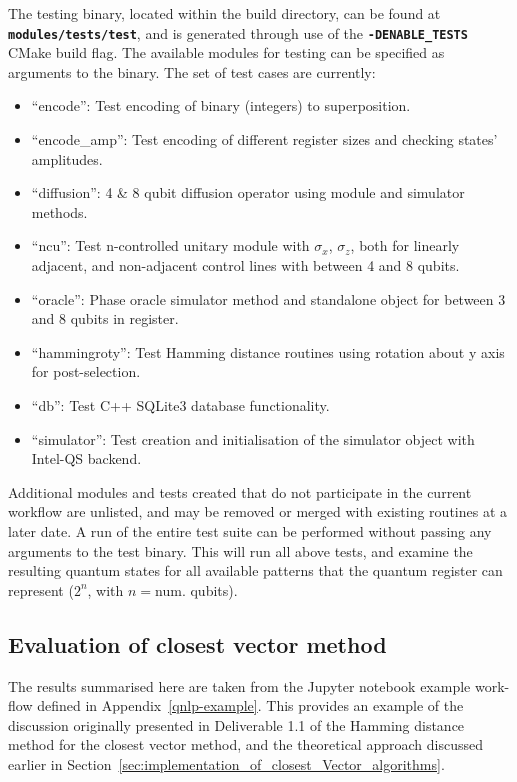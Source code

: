The testing binary, located within the build directory, can be found at \textbf{\lstinline{modules/tests/test}}, and is generated through use of the \textbf{\lstinline{-DENABLE_TESTS}} CMake build flag. The available modules for testing can be specified as arguments to the binary. The set of test cases are currently:
\begin{itemize}
    \item ``encode'': Test encoding of binary (integers) to superposition.
    \item ``encode\_amp'': Test encoding of different register sizes and checking states' amplitudes.
    \item ``diffusion'': 4 \& 8 qubit diffusion operator using module and simulator methods.
    \item ``ncu'': Test n-controlled unitary module with $\sigma_x$, $\sigma_z$, both for linearly adjacent, and non-adjacent control lines with between 4 and 8 qubits.
    \item ``oracle'': Phase oracle simulator method and standalone object for between 3 and 8 qubits in register.
    \item ``hammingroty'': Test Hamming distance routines using rotation about y axis for post-selection.
    \item ``db'': Test C++ SQLite3 database functionality.
    \item ``simulator'': Test creation and initialisation of the simulator object with Intel\textregistered-QS backend.
\end{itemize}

Additional modules and tests created that do not participate in the current workflow are unlisted, and may be removed or merged with existing routines at a later date. A run of the entire test suite can be performed without passing any arguments to the test binary. This will run all above tests, and examine the resulting quantum states for all available patterns that the quantum register can represent ($2^{n}$, with $n=$num. qubits).

\subsection{Evaluation of closest vector method}
\label{sec:evaluation_of_cv_algorithms}

The results summarised here are taken from the Jupyter notebook example work-flow defined in Appendix~\ref{qnlp-example}. This provides an example of the discussion originally presented in Deliverable 1.1 of the Hamming distance method for the closest vector method, and the theoretical approach discussed earlier in Section~\ref{sec:implementation_of_closest_Vector_algorithms}.

